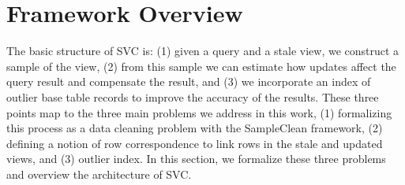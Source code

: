 \section{Framework Overview}\label{sec-arch}
The basic structure of SVC is: (1) given a query and a stale view, we construct a sample of the view, (2) from this sample we can estimate how updates affect the query result and compensate the result, and (3) we incorporate an index of outlier base table records to improve the accuracy of the results.
These three points map to the three main problems we address in this work, (1) formalizing this process as a data cleaning problem with the SampleClean framework, (2) defining a notion of row correspondence to link rows in the stale and updated views, and (3) outlier index.
In this section, we formalize these three problems and overview the architecture of SVC.


